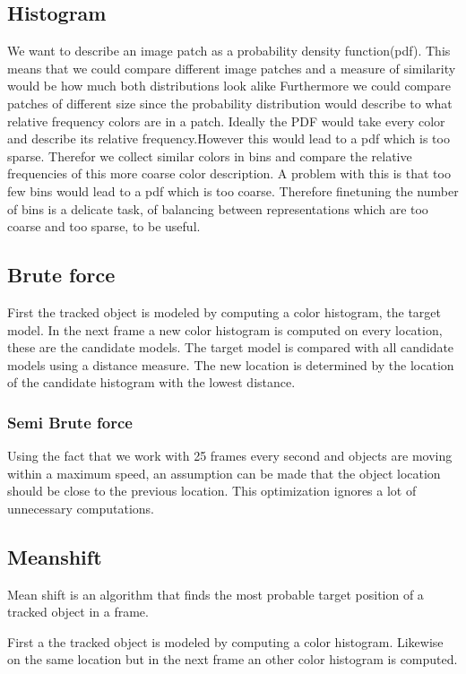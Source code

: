 \documentclass[a4paper,11pt]{article}
\begin{document}
	\subsection{Histogram}
		We want to describe an image patch as a probability density function(pdf). This means that we could compare different image patches and a measure of similarity would be how much both distributions look alike %
		Furthermore we could compare patches of different size since the probability distribution would describe to what relative frequency colors are in a patch.
		Ideally the PDF  would take every color and describe its relative frequency.However this would lead to a pdf which is too sparse. Therefor we collect similar colors in bins and compare the relative frequencies of this more coarse color description. A problem with this is that too few bins would lead to a pdf which is too coarse. Therefore finetuning the number of bins is a delicate task, of balancing between representations which are too coarse and too sparse, to be useful. 

	\subsection{Brute force}
		First the tracked object is modeled by computing a color histogram, the
		target model.
		In the next frame a new color histogram is computed on every location,
		these are the candidate models.
		The target model is compared with all candidate models using a distance
		measure. The new location is determined by the location of the candidate
		histogram with the lowest distance.
		
		\subsubsection{Semi Brute force}
		Using the fact that we work with 25 frames every second and objects are moving
		within a maximum speed, an assumption can be made that the object
		location should be close to the previous location. This optimization
		ignores a lot of unnecessary computations.

	
	\subsection{Meanshift}
		Mean shift is an algorithm that finds the most probable target position of a
		tracked object in a frame.

		First a the tracked object is modeled by computing a color histogram.
		Likewise on the same location but in the next frame an other color histogram is
		computed.
\end{document}

